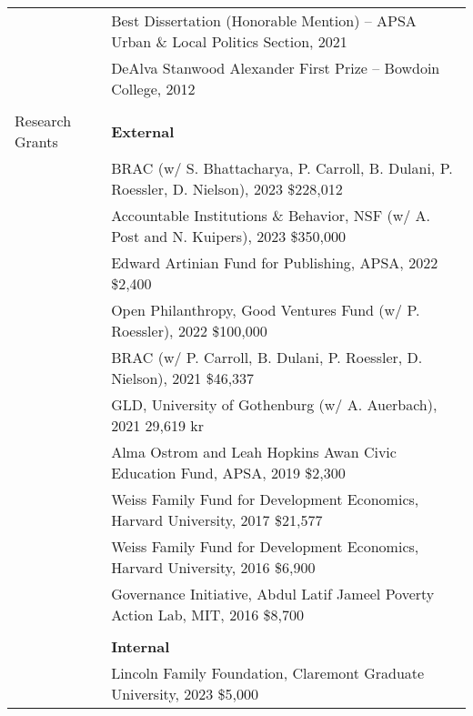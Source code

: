 \documentclass[letterpaper, 10.5pt]{article}
\begin{document}
\begin{longtable}{p{1.5in}p{5in}}
& Best Dissertation  (Honorable Mention) -- APSA Urban \& Local Politics Section, 2021 \\
& DeAlva Stanwood Alexander First Prize -- Bowdoin College, 2012 \\

& \\

{{Research Grants}} 
& \textbf{External}\\
& BRAC (w/ S. Bhattacharya, P. Carroll, B. Dulani, P. Roessler,  D. Nielson), 2023
 \hfill \$228,012\\
& Accountable Institutions \& Behavior, NSF (w/ A. Post and N. Kuipers), 2023 \hfill \$350,000\\
& Edward Artinian Fund for Publishing, APSA, 2022 \hfill \$2,400\\
& Open Philanthropy, Good Ventures Fund (w/ P. Roessler), 2022 \hfill \$100,000\\
& BRAC (w/ P. Carroll, B. Dulani, P. Roessler,  D. Nielson), 2021
 \hfill \$46,337\\


& GLD, University of Gothenburg (w/ A. Auerbach), 2021
\hfill 29,619 kr \\


& Alma Ostrom and Leah Hopkins Awan Civic Education Fund, APSA, 2019 \hfill \$2,300\\



& Weiss Family Fund for Development Economics, Harvard University, 2017
 \hfill \$21,577\\


&Weiss Family Fund for Development Economics, Harvard University, 2016 \hfill \$6,900  \\

&Governance Initiative, Abdul Latif Jameel Poverty Action Lab, MIT, 2016 \hfill \$8,700 \\

& \\

& \textbf{Internal}\\

& Lincoln Family Foundation, Claremont Graduate University, 2023 \hfill \$5,000\\



\end{longtable}
\end{document}
